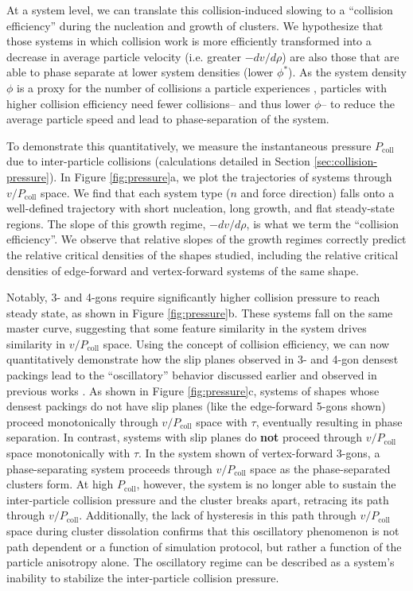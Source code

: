 At a system level, we can translate this collision-induced slowing to a ``collision efficiency'' during the nucleation and growth of clusters.
We hypothesize that those systems in which collision work is more efficiently transformed into a decrease in average particle velocity (i.e. greater $-{dv}/{d\rho}$) are also those that are able to phase separate at lower system densities (lower $\phi^*$).
As the system density $\phi$ is a proxy for the number of collisions a particle experiences \cite{Bruss_2018_PRE}, particles with higher collision efficiency need fewer collisions-- and thus lower $\phi$-- to reduce the average particle speed and lead to phase-separation of the system.

To demonstrate this quantitatively, we measure the instantaneous pressure $P_\text{coll}$ due to inter-particle collisions (calculations detailed in Section \ref{sec:collision-pressure}).
In Figure \ref{fig:pressure}a, we plot the trajectories of systems through $v/P_\text{coll}$ space.
We find that each system type ($n$ and force direction) falls onto a well-defined trajectory with short nucleation, long growth, and flat steady-state regions.
The slope of this growth regime, $-{dv}/{d\rho}$, is what we term the ``collision efficiency''.
We observe that relative slopes of the growth regimes correctly predict the relative critical densities of the shapes studied, including the relative critical densities of edge-forward and vertex-forward systems of the same shape.

Notably, 3- and 4-gons require significantly higher collision pressure to reach steady state, as shown in Figure \ref{fig:pressure}b.
These systems fall on the same master curve, suggesting that some feature similarity in the system drives similarity in $v/P_\text{coll}$ space.
Using the concept of collision efficiency, we can now quantitatively demonstrate how the slip planes observed in 3- and 4-gon densest packings lead to the ``oscillatory'' behavior discussed earlier and observed in previous works \cite{Prymidis_2016_SoftMatter}.
As shown in Figure \ref{fig:pressure}c, systems of shapes whose densest packings do not have slip planes (like the edge-forward 5-gons shown) proceed monotonically through $v/P_\text{coll}$ space with $\tau$, eventually resulting in phase separation.
In contrast, systems with slip planes do \textbf{not} proceed through $v/P_\text{coll}$ space monotonically with $\tau$.
In the system shown of vertex-forward 3-gons, a phase-separating system proceeds through $v/P_\text{coll}$ space as the phase-separated clusters form.
At high $P_\text{coll}$, however, the system is no longer able to sustain the inter-particle collision pressure and the cluster breaks apart, retracing its path through $v/P_\text{coll}$.
Additionally, the lack of hysteresis in this path through $v/P_\text{coll}$ space during cluster dissolation confirms that this oscillatory phenomenon is not path dependent or a function of simulation protocol, but rather a function of the particle anisotropy alone.
The oscillatory regime can be described as a system's inability to stabilize the inter-particle collision pressure.

